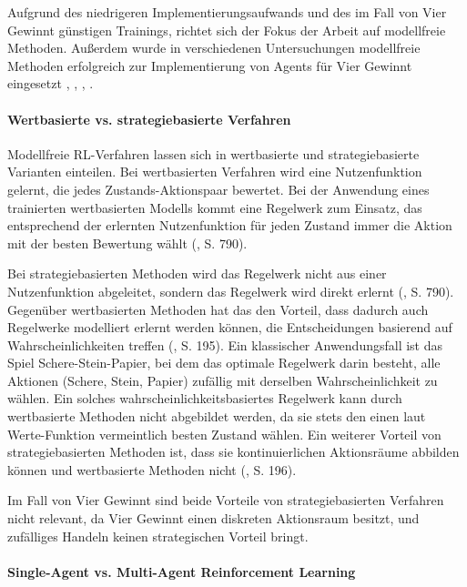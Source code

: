 Aufgrund des niedrigeren Implementierungsaufwands und des im Fall von Vier Gewinnt günstigen Trainings, richtet sich der Fokus der Arbeit auf modellfreie Methoden. Außerdem wurde in verschiedenen Untersuchungen modellfreie Methoden erfolgreich zur Implementierung von Agents für Vier Gewinnt eingesetzt \cite{Alderton.2019}, \cite{Taylor.2024}, \cite{Dabas.2022}, \cite{Wäldchen.2022}.

\paragraph{Wertbasierte vs. strategiebasierte Verfahren}

Modellfreie RL-Verfahren lassen sich in wertbasierte und strategiebasierte Varianten einteilen. Bei wertbasierten Verfahren wird eine Nutzenfunktion gelernt, die jedes Zustands-Aktionspaar bewertet. Bei der Anwendung eines trainierten wertbasierten Modells kommt eine Regelwerk zum Einsatz, das entsprechend der erlernten Nutzenfunktion für jeden Zustand immer die Aktion mit der besten Bewertung wählt (\cite{Russell.2020}, S. 790).

Bei strategiebasierten Methoden wird das Regelwerk nicht aus einer Nutzenfunktion abgeleitet, sondern das Regelwerk wird direkt erlernt (\cite{Russell.2020}, S. 790). Gegenüber wertbasierten Methoden hat das den Vorteil, dass dadurch auch Regelwerke modelliert erlernt werden können, die Entscheidungen basierend auf Wahrscheinlichkeiten treffen (\cite{Albrecht.2024}, S. 195). Ein klassischer Anwendungsfall ist das Spiel Schere-Stein-Papier, bei dem das optimale Regelwerk darin besteht, alle Aktionen (Schere, Stein, Papier) zufällig mit derselben Wahrscheinlichkeit zu wählen. Ein solches wahrscheinlichkeitsbasiertes Regelwerk kann durch wertbasierte Methoden nicht abgebildet werden, da sie stets den einen laut Werte-Funktion vermeintlich besten Zustand wählen. Ein weiterer Vorteil von strategiebasierten Methoden ist, dass sie kontinuierlichen Aktionsräume abbilden können und wertbasierte Methoden nicht (\cite{Albrecht.2024}, S. 196).

Im Fall von Vier Gewinnt sind beide Vorteile von strategiebasierten Verfahren nicht relevant, da Vier Gewinnt einen diskreten Aktionsraum besitzt, und zufälliges Handeln keinen strategischen Vorteil bringt.

\paragraph{Single-Agent vs. Multi-Agent Reinforcement Learning}

